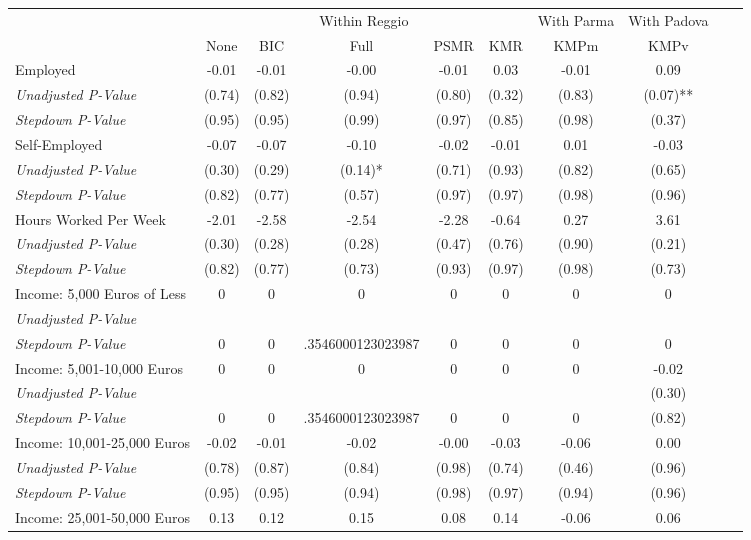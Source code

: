 \begin{tabular}{l c c c c c c c c c}
\toprule
& \multicolumn{5}{c}{Within Reggio} & With Parma & With Padova \\\cmidrule(lr){2-6} \cmidrule(lr){7} \cmidrule(lr){8}
 & None & BIC & Full & PSMR & KMR & KMPm & KMPv \\
\midrule
Employed & -0.01 & -0.01 & -0.00 & -0.01 & 0.03 & -0.01 & 0.09 \\
\quad \textit{Unadjusted P-Value} & (0.74) & (0.82) & (0.94) & (0.80) & (0.32) & (0.83) & (0.07)** \\
\quad \textit{Stepdown P-Value} & (0.95) & (0.95) & (0.99) & (0.97) & (0.85) & (0.98) & (0.37) \\
Self-Employed & -0.07 & -0.07 & -0.10 & -0.02 & -0.01 & 0.01 & -0.03 \\
\quad \textit{Unadjusted P-Value} & (0.30) & (0.29) & (0.14)* & (0.71) & (0.93) & (0.82) & (0.65) \\
\quad \textit{Stepdown P-Value} & (0.82) & (0.77) & (0.57) & (0.97) & (0.97) & (0.98) & (0.96) \\
Hours Worked Per Week & -2.01 & -2.58 & -2.54 & -2.28 & -0.64 & 0.27 & 3.61 \\
\quad \textit{Unadjusted P-Value} & (0.30) & (0.28) & (0.28) & (0.47) & (0.76) & (0.90) & (0.21) \\
\quad \textit{Stepdown P-Value} & (0.82) & (0.77) & (0.73) & (0.93) & (0.97) & (0.98) & (0.73) \\
Income: 5,000 Euros of Less & 0 & 0 & 0 & 0 & 0 & 0 & 0 \\
\quad \textit{Unadjusted P-Value} & & & & & & & \\
\quad \textit{Stepdown P-Value} & 0 & 0 & .3546000123023987 & 0 & 0 & 0 & 0 \\
Income: 5,001-10,000 Euros & 0 & 0 & 0 & 0 & 0 & 0 & -0.02 \\
\quad \textit{Unadjusted P-Value} & & & & & & & (0.30) \\
\quad \textit{Stepdown P-Value} & 0 & 0 & .3546000123023987 & 0 & 0 & 0 & (0.82) \\
Income: 10,001-25,000 Euros & -0.02 & -0.01 & -0.02 & -0.00 & -0.03 & -0.06 & 0.00 \\
\quad \textit{Unadjusted P-Value} & (0.78) & (0.87) & (0.84) & (0.98) & (0.74) & (0.46) & (0.96) \\
\quad \textit{Stepdown P-Value} & (0.95) & (0.95) & (0.94) & (0.98) & (0.97) & (0.94) & (0.96) \\
Income: 25,001-50,000 Euros & 0.13 & 0.12 & 0.15 & 0.08 & 0.14 & -0.06 & 0.06 \\

\end{tabular}
